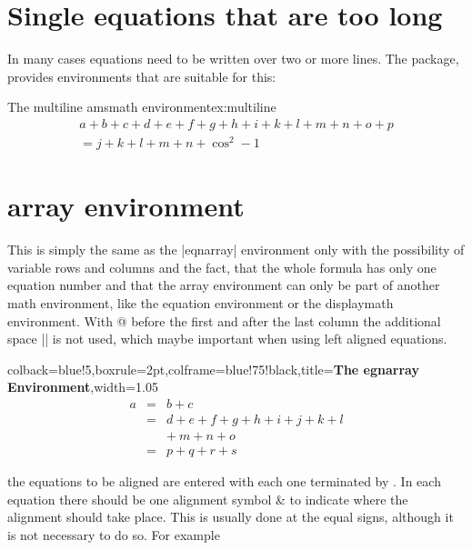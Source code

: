 \section{Single equations that are too long}

In many cases equations need to be written over two or more lines. The  package, provides environments that are suitable for this:


\begin{texexample}{The multiline amsmath environment}{ex:multiline}
\begin{multline}
   a + b + c + d + e + f+ g + h + i  + k + l + m + n + o + p\\
              = j + k + l + m + n +\cos^{2}-1
\end{multline}
\end{texexample}



\newpage


\section{array environment}
This is simply the same as the |eqnarray| environment only with the possibility of
variable rows and columns and the fact, that the whole formula has only one
equation number and that the array environment can only be part of another math
environment, like the equation environment or the displaymath environment. With
@{} before the first and after the last column the additional space |\arraycolsep| is
not used, which maybe important when using left aligned equations.

\begin{tcblisting}{colback=blue!5,boxrule=2pt,colframe=blue!75!black,title=\textbf{The egnarray Environment},width=1.05\textwidth}
\begin{eqnarray}
a & = & b + c \\
& = & d + e + f + g + h + i
+ j + k + l \nonumber \\
&& +\: m + n + o \\
& = & p + q + r + s
\end{eqnarray}
\end{tcblisting}



the equations
to be aligned are entered with each one terminated by . In each equation there should be
one alignment symbol \& to indicate where the alignment should take place. This is usually
done at the equal signs, although it is not necessary to do so. For example

